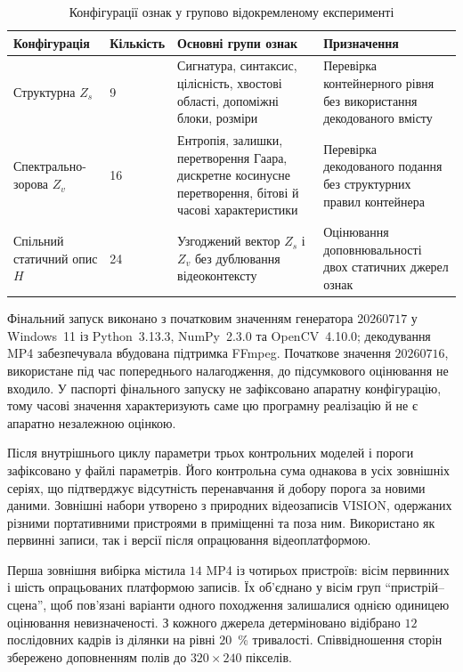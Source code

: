 \begin{table}[htbp]
\caption{Конфігурації ознак у групово відокремленому експерименті}
\label{tab:ch4_feature_configs}
\centering
\small
\begin{tabularx}{\textwidth}{p{}p{}Y Y}
\toprule
Конфігурація & Кількість & Основні групи ознак & Призначення \\
\midrule
Структурна $Z_s$ & 9 & Сигнатура, синтаксис, цілісність, хвостові області, допоміжні блоки, розміри & Перевірка контейнерного рівня без використання декодованого вмісту \\
Спектрально-зорова $Z_v$ & 16 & Ентропія, залишки, перетворення Гаара, дискретне косинусне перетворення, бітові й часові характеристики & Перевірка декодованого подання без структурних правил контейнера \\
Спільний статичний опис $H$ & 24 & Узгоджений вектор $Z_s$ і $Z_v$ без дублювання відеоконтексту & Оцінювання доповнювальності двох статичних джерел ознак \\
\bottomrule
\end{tabularx}
\end{table}

Фінальний запуск виконано з початковим значенням генератора $20260717$ у Windows~11 із Python~3.13.3, NumPy~2.3.0 та OpenCV~4.10.0; декодування MP4 забезпечувала вбудована підтримка FFmpeg. Початкове значення $20260716$, використане під час попереднього налагодження, до підсумкового оцінювання не входило. У паспорті фінального запуску не зафіксовано апаратну конфігурацію, тому часові значення характеризують саме цю програмну реалізацію й не є апаратно незалежною оцінкою.

Після внутрішнього циклу параметри трьох контрольних моделей і пороги зафіксовано у файлі параметрів. Його контрольна сума однакова в усіх зовнішніх серіях, що підтверджує відсутність перенавчання й добору порога за новими даними. Зовнішні набори утворено з природних відеозаписів VISION, одержаних різними портативними пристроями в приміщенні та поза ним. Використано як первинні записи, так і версії після опрацювання відеоплатформою.

Перша зовнішня вибірка містила $14$ MP4 із чотирьох пристроїв: вісім первинних і шість опрацьованих платформою записів. Їх об’єднано у вісім груп ``пристрій--сцена'', щоб пов’язані варіанти одного походження залишалися однією одиницею оцінювання невизначеності. З кожного джерела детерміновано відібрано $12$ послідовних кадрів із ділянки на рівні $20$~\% тривалості. Співвідношення сторін збережено доповненням полів до $320\times240$ пікселів.

